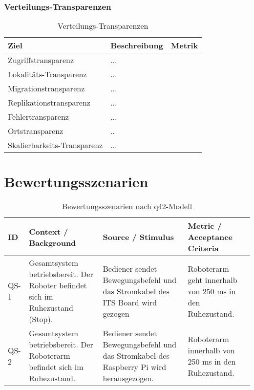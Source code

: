 \newpage
\subsubsection{Verteilungs-Transparenzen}
\begin{table}[h!]
	\centering
	\begin{tabular}{p{4cm}|p{5cm}|p{5cm}|}
		\hline
		\textbf{Ziel} & \textbf{Beschreibung} & \textbf{Metrik} \\
		\hline
		Zugriffstransparenz   & ...&\\
		\hline
		Lokalitäts-Transparenz  & ...&\\
		\hline
		Migrationstransparenz & ...&\\
		\hline
		Replikationstransparenz &...&\\
		\hline
		Fehlertransparenz &... &\\
		\hline
		Ortstransparenz & .. &\\
		\hline
		Skalierbarkeits-Transparenz & ... & \\
		\hline
	\end{tabular}
	\caption{Verteilungs-Transparenzen}
	\label{tab:transparenzen}
\end{table}

\newpage

\section{Bewertungsszenarien}
\begin{table}[h!]
\centering
\begin{tabular}{p{2cm}|p{5cm}|p{4cm}|p{5cm}}
\hline
\textbf{ID} & \textbf{Context / Background} & \textbf{Source / Stimulus} & \textbf{Metric / Acceptance Criteria} \\
\hline
QS-1 &
Gesamtsystem betriebsbereit. Der Roboter befindet sich im Ruhezustand (Stop). &
Bediener sendet Bewegungsbefehl und das Stromkabel des ITS Board wird gezogen & 
Roboterarm geht innerhalb von 250 ms in den Ruhezustand. \\

\hline
QS-2 &
Gesamtsystem betriebsbereit. Der Roboterarm befindet sich im Ruhezustand. &
Bediener sendet Bewegungsbefehl und das Stromkabel des Raspberry Pi wird herausgezogen. &
Roboterarm innerhalb von 250 ms in den Ruhezustand. 

\end{tabular}
\caption{Bewertungsszenarien nach q42-Modell}
\label{tab:bewertungsszenarien}
\end{table}



